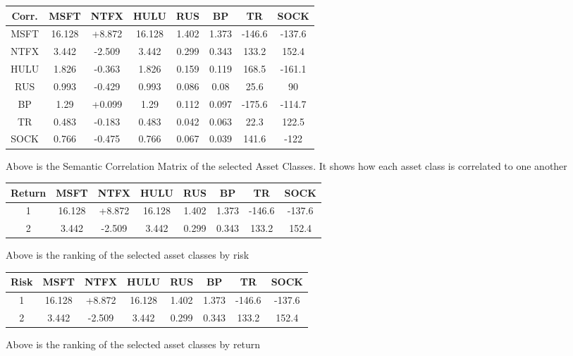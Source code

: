 \documentclass{article}
\begin{document}
\begin{center}

\begin{tabular}{cccccccc} \toprule
    Corr. & MSFT & NTFX & HULU  & RUS & BP & TR & SOCK\\ \midrule
    MSFT  & 16.128 & +8.872 & 16.128 & 1.402 & 1.373 & -146.6 & -137.6 \\\midrule
    NTFX  & 3.442  & -2.509 & 3.442  & 0.299 & 0.343 & 133.2  & 152.4  \\\midrule
    HULU  & 1.826  & -0.363 & 1.826  & 0.159 & 0.119 & 168.5  & -161.1 \\\midrule
    RUS  & 0.993  & -0.429 & 0.993  & 0.086 & 0.08  & 25.6   & 90     \\ \midrule
    BP  & 1.29   & +0.099 & 1.29   & 0.112 & 0.097 & -175.6 & -114.7 \\\midrule
    TR  & 0.483  & -0.183 & 0.483  & 0.042 & 0.063 & 22.3   & 122.5  \\\midrule
    SOCK  & 0.766  & -0.475 & 0.766  & 0.067 & 0.039 & 141.6  & -122    \\ \bottomrule
\end{tabular}

\end{center}

Above is the Semantic Correlation Matrix of the selected Asset Classes. It shows how each asset class is correlated to one another

\vspace{1cm}



\begin{center}

\begin{tabular}{cccccccc} \toprule
    Return & MSFT & NTFX & HULU  & RUS & BP & TR & SOCK\\ \midrule
    1  & 16.128 & +8.872 & 16.128 & 1.402 & 1.373 & -146.6 & -137.6 \\
    2  & 3.442  & -2.509 & 3.442  & 0.299 & 0.343 & 133.2  & 152.4  \\

\end{tabular}

\end{center}


Above is the ranking of the selected asset classes by risk

\vspace{1cm}


\begin{center}

\begin{tabular}{cccccccc} \toprule
    Risk & MSFT & NTFX & HULU  & RUS & BP & TR & SOCK\\ \midrule
    1  & 16.128 & +8.872 & 16.128 & 1.402 & 1.373 & -146.6 & -137.6 \\
    2  & 3.442  & -2.509 & 3.442  & 0.299 & 0.343 & 133.2  & 152.4  \\

\end{tabular}

\end{center}


Above is the ranking of the selected asset classes by return


\medskip


\end{document}

